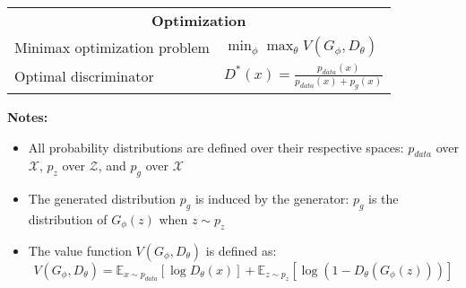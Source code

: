 \begin{center}
\begin{minipage}{0.9\textwidth}
\begin{tabular}{@{}p{} p{}@{}}
\multicolumn{2}{c}{\textbf{Optimization}} \\
Minimax optimization problem & $\min_{\phi} \max_{\theta} V(G_\phi, D_\theta)$ \\
Optimal discriminator & $D^*(x) = \frac{p_{data}(x)}{p_{data}(x) + p_g(x)}$ \\
\bottomrule
\end{tabular}
\end{minipage}
\end{center}

\vspace{0.5cm}

\begin{center}
\begin{minipage}{0.9\textwidth}
\footnotesize
\noindent\textbf{Notes:}
\begin{itemize}
\item All probability distributions are defined over their respective spaces: $p_{data}$ over $\mathcal{X}$, $p_z$ over $\mathcal{Z}$, and $p_g$ over $\mathcal{X}$
\item The generated distribution $p_g$ is induced by the generator: $p_g$ is the distribution of $G_\phi(z)$ when $z \sim p_z$
\item The value function $V(G_\phi, D_\theta)$ is defined as:
\[
V(G_\phi, D_\theta) = \mathbb{E}_{x \sim p_{data}}[\log D_\theta(x)] + \mathbb{E}_{z \sim p_z}[\log(1 - D_\theta(G_\phi(z)))]
\]
\end{itemize}
\end{minipage}
\end{center}

